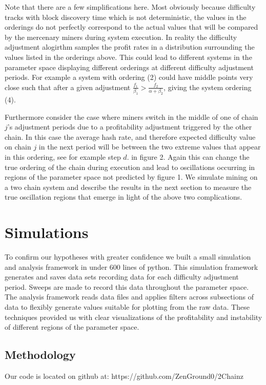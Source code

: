 \documentclass[10pt, preprint]{aastex}
\begin{document}
Note that there are a few simplifications here.  Most obviously because difficulty tracks with block discovery time which is not deterministic, the values in the orderings do not perfectly correspond to the actual values that will be compared by the mercenary miners during system execution.  In reality the difficulty adjustment alogirthm samples the profit rates in a distribution surrounding the values listed in the orderings above.  This could lead to different systems in the parameter space displaying different orderings at different difficulty adjustment periods.  For example a system with ordering (2) could have middle points very close such that after a given adjustment $\frac{f_1}{\beta_1} >\frac{f_2}{\alpha + \beta_2}$, giving the system ordering (4).

Furthermore consider the case where miners switch in the middle of one of chain $j$'s adjustment periods due to a profitability adjustment triggered by the other chain.  In this case the average hash rate, and therefore expected difficulty value on chain $j$ in the next period will be between the two extreme values that appear in this ordering, see for example step $d.$ in figure 2.  Again this can change the true ordering of the chain during execution and lead to oscillations occurring in regions of the parameter space not predicted by figure 1.  We simulate mining on a two chain system and describe the results in the next section to measure the true oscillation regions that emerge in light of the above two complications.

\section{Simulations}
To confirm our hypotheses with greater confidence we built a small simulation and analysis framework in under 600 lines of python.  This simulation framework generates and saves data sets recording data for each difficulty adjustment period.  Sweeps are made to record this data throughout the parameter space.  The analysis framework reads data files and applies filters across subsections of data to flexibly generate values suitable for plotting from the raw data.  These techniques provided us with clear visualizations of the profitability and instability of different regions of the parameter space.

\subsection{Methodology}
Our code is located on github at: https://github.com/ZenGround0/2Chainz
\end{document}
